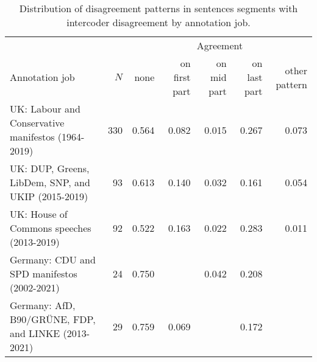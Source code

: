 \begin{table}[!t]

\caption{\label{tab:agreement_patterns}Distribution of disagreement patterns in sentences segments with intercoder disagreement by annotation job.}
\centering
\fontsize{10}{12}\selectfont
\begin{tabular}[t]{lrrrrrr}
\toprule
\multicolumn{2}{c}{ } & \multicolumn{5}{c}{Agreement} \\
\cmidrule(l{3pt}r{3pt}){3-7}
Annotation job & $N$ & none & on first part & on mid part & on last part & other pattern\\
\midrule
UK: Labour and Conservative manifestos (1964-2019) & 330 & 0.564 & 0.082 & 0.015 & 0.267 & 0.073\\
UK: DUP, Greens, LibDem, SNP, and UKIP (2015-2019) & 93 & 0.613 & 0.140 & 0.032 & 0.161 & 0.054\\
UK: House of Commons speeches (2013-2019) & 92 & 0.522 & 0.163 & 0.022 & 0.283 & 0.011\\
Germany: CDU and SPD manifestos (2002-2021) & 24 & 0.750 &  & 0.042 & 0.208 & \\
Germany: AfD, B90/GRÜNE, FDP, and LINKE (2013-2021) & 29 & 0.759 & 0.069 &  & 0.172 & \\
\bottomrule
\end{tabular}
\end{table}
